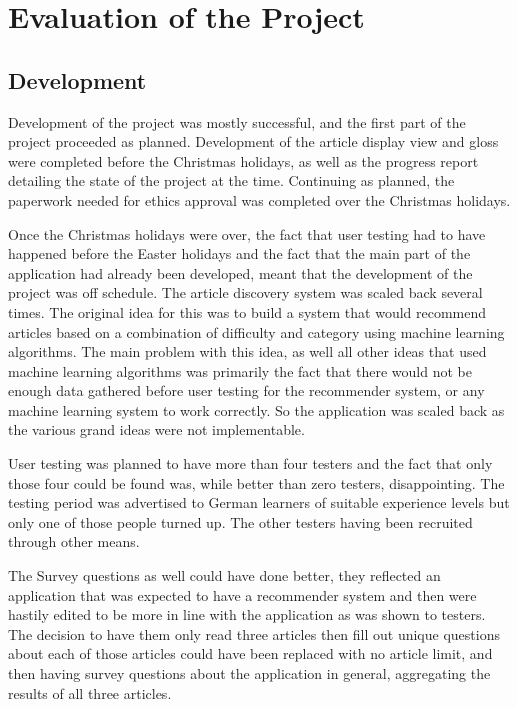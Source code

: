 \chapter{Evaluation of the Project}

\section{Development}

Development of the project was mostly successful, and the first part of the project proceeded as planned. Development of the article display view and gloss were completed before the Christmas holidays, as well as the progress report detailing the state of the project at the time. Continuing as planned, the paperwork needed for ethics approval was completed over the Christmas holidays. 

Once the Christmas holidays were over, the fact that user testing had to have happened before the Easter holidays and the fact that the main part of the application had already been developed, meant that the development of the project was off schedule. The article discovery system was scaled back several times. The original idea for this was to build a system that would recommend articles based on a combination of difficulty and category using machine learning algorithms. The main problem with this idea, as well all other ideas that used machine learning algorithms was primarily the fact that there would not be enough data gathered before user testing for the recommender system, or any machine learning system to work correctly. So the application was scaled back as the various grand ideas were not implementable.

User testing was planned to have more than four testers and the fact that only those four could be found was, while better than zero testers, disappointing. The testing period was advertised to German learners of suitable experience levels but only one of those people turned up. The other testers having been recruited through other means.

The Survey questions as well could have done better, they reflected an application that was expected to have a recommender system and then were hastily edited to be more in line with the application as was shown to testers. The decision to have them only read three articles then fill out unique questions about each of those articles could have been replaced with no article limit, and then having survey questions about the application in general, aggregating the results of all three articles.

